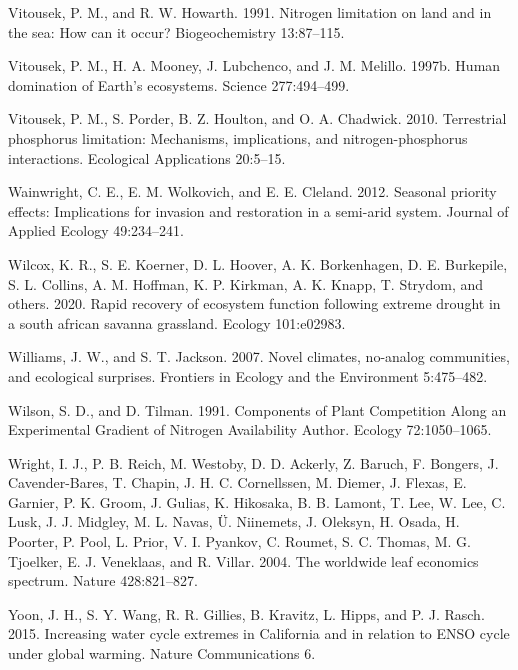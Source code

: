 \documentclass[twoside,12pt,final]{ucthesis-CA2012}
\begin{document}
\begin{ucmainmatter}
\leavevmode\hypertarget{ref-Vitousek1991}{}%
Vitousek, P. M., and R. W. Howarth. 1991. Nitrogen limitation on land and in the sea: How can it occur? Biogeochemistry 13:87--115.

\leavevmode\hypertarget{ref-Vitousek1997}{}%
Vitousek, P. M., H. A. Mooney, J. Lubchenco, and J. M. Melillo. 1997b. Human domination of Earth's ecosystems. Science 277:494--499.

\leavevmode\hypertarget{ref-Vitousek2010}{}%
Vitousek, P. M., S. Porder, B. Z. Houlton, and O. A. Chadwick. 2010. Terrestrial phosphorus limitation: Mechanisms, implications, and nitrogen-phosphorus interactions. Ecological Applications 20:5--15.

\leavevmode\hypertarget{ref-Wainwright2012}{}%
Wainwright, C. E., E. M. Wolkovich, and E. E. Cleland. 2012. Seasonal priority effects: Implications for invasion and restoration in a semi-arid system. Journal of Applied Ecology 49:234--241.

\leavevmode\hypertarget{ref-Wilcox2020}{}%
Wilcox, K. R., S. E. Koerner, D. L. Hoover, A. K. Borkenhagen, D. E. Burkepile, S. L. Collins, A. M. Hoffman, K. P. Kirkman, A. K. Knapp, T. Strydom, and others. 2020. Rapid recovery of ecosystem function following extreme drought in a south african savanna grassland. Ecology 101:e02983.

\leavevmode\hypertarget{ref-Williams2007}{}%
Williams, J. W., and S. T. Jackson. 2007. Novel climates, no-analog communities, and ecological surprises. Frontiers in Ecology and the Environment 5:475--482.

\leavevmode\hypertarget{ref-Wilson1991}{}%
Wilson, S. D., and D. Tilman. 1991. Components of Plant Competition Along an Experimental Gradient of Nitrogen Availability Author. Ecology 72:1050--1065.

\leavevmode\hypertarget{ref-Wright2004}{}%
Wright, I. J., P. B. Reich, M. Westoby, D. D. Ackerly, Z. Baruch, F. Bongers, J. Cavender-Bares, T. Chapin, J. H. C. Cornellssen, M. Diemer, J. Flexas, E. Garnier, P. K. Groom, J. Gulias, K. Hikosaka, B. B. Lamont, T. Lee, W. Lee, C. Lusk, J. J. Midgley, M. L. Navas, Ü. Niinemets, J. Oleksyn, H. Osada, H. Poorter, P. Pool, L. Prior, V. I. Pyankov, C. Roumet, S. C. Thomas, M. G. Tjoelker, E. J. Veneklaas, and R. Villar. 2004. The worldwide leaf economics spectrum. Nature 428:821--827.

\leavevmode\hypertarget{ref-Yoon2015}{}%
Yoon, J. H., S. Y. Wang, R. R. Gillies, B. Kravitz, L. Hipps, and P. J. Rasch. 2015. Increasing water cycle extremes in California and in relation to ENSO cycle under global warming. Nature Communications 6.


\end{ucmainmatter}
\end{document}
